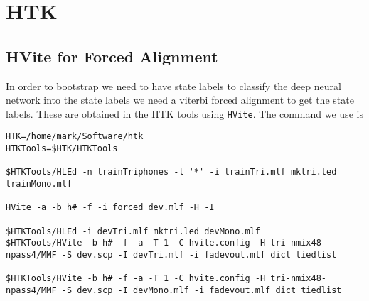 \section{HTK}

\subsection{HVite for Forced Alignment}

In order to bootstrap we need to have state labels to classify the deep
neural network into the state labels we need a viterbi forced alignment
to get the state labels.  These are obtained in the HTK tools using
\texttt{HVite}.  The command we use is
\begin{verbatim}
HTK=/home/mark/Software/htk
HTKTools=$HTK/HTKTools

$HTKTools/HLEd -n trainTriphones -l '*' -i trainTri.mlf mktri.led trainMono.mlf

HVite -a -b h# -f -i forced_dev.mlf -H -I

$HTKTools/HLEd -i devTri.mlf mktri.led devMono.mlf
$HTKTools/HVite -b h# -f -a -T 1 -C hvite.config -H tri-nmix48-npass4/MMF -S dev.scp -I devTri.mlf -i fadevout.mlf dict tiedlist 

$HTKTools/HVite -b h# -f -a -T 1 -C hvite.config -H tri-nmix48-npass4/MMF -S dev.scp -I devMono.mlf -i fadevout.mlf dict tiedlist 
\end{verbatim}
